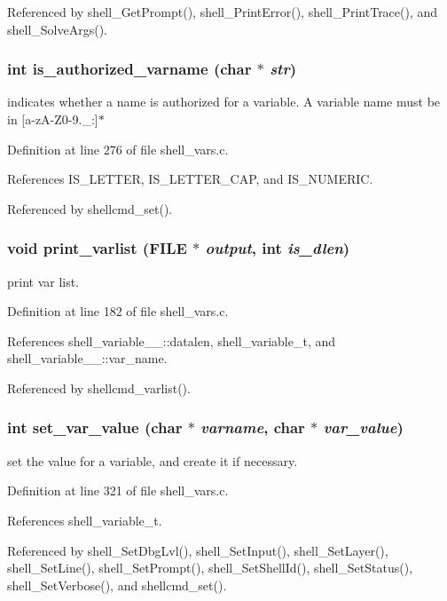 Referenced by shell\_\-Get\-Prompt(), shell\_\-Print\-Error(), shell\_\-Print\-Trace(), and shell\_\-Solve\-Args().
\subsubsection{\setlength{\rightskip}{0pt plus 5cm}int is\_\-authorized\_\-varname (char $\ast$ {\em str})}\label{shell__vars_8h_a1}


indicates whether a name is authorized for a variable. A variable name must be in [a-z\-A-Z0-9.\_\-:]$\ast$ 

Definition at line 276 of file shell\_\-vars.c.

References IS\_\-LETTER, IS\_\-LETTER\_\-CAP, and IS\_\-NUMERIC.

Referenced by shellcmd\_\-set().
\subsubsection{\setlength{\rightskip}{0pt plus 5cm}void print\_\-varlist (FILE $\ast$ {\em output}, int {\em is\_\-dlen})}\label{shell__vars_8h_a5}


print var list. 

Definition at line 182 of file shell\_\-vars.c.

References shell\_\-variable\_\-\_\-::datalen, shell\_\-variable\_\-t, and shell\_\-variable\_\-\_\-::var\_\-name.

Referenced by shellcmd\_\-varlist().
\subsubsection{\setlength{\rightskip}{0pt plus 5cm}int set\_\-var\_\-value (char $\ast$ {\em varname}, char $\ast$ {\em var\_\-value})}\label{shell__vars_8h_a3}


set the value for a variable, and create it if necessary. 

Definition at line 321 of file shell\_\-vars.c.

References shell\_\-variable\_\-t.

Referenced by shell\_\-Set\-Dbg\-Lvl(), shell\_\-Set\-Input(), shell\_\-Set\-Layer(), shell\_\-Set\-Line(), shell\_\-Set\-Prompt(), shell\_\-Set\-Shell\-Id(), shell\_\-Set\-Status(), shell\_\-Set\-Verbose(), and shellcmd\_\-set().